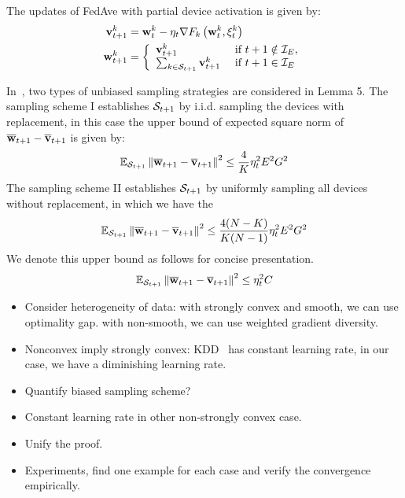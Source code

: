 The updates of FedAve with partial device activation is given by: 
\begin{align} 
\mathbf{v}_{t+1}^{k} &=\mathbf{w}_{t}^{k}-\eta_{t} \nabla F_{k}\left(\mathbf{w}_{t}^{k}, \xi_{t}^{k}\right) \\ \mathbf{w}_{t+1}^{k} &=\left\{\begin{array}{ll}\mathbf{v}_{t+1}^{k} & \text { if } t+1 \notin \mathcal{I}_{E}, \\ 
\sum_{k \in {\mathcal{S}}_{t+1}} \mathbf{v}_{t+1}^{k} & \text { if } t+1 \in \mathcal{I}_{E}\end{array}\right.
\end{align}

In~\cite{li2019convergence}, two types of unbiased sampling strategies are considered in Lemma 5. 
The sampling scheme I establishes ${\mathcal{S}}_{t+1}$ by i.i.d. sampling the devices with replacement,
in this case the upper bound of expected square norm of ${\overline{\mathbf{w}}}_{t+1} - {\overline{\mathbf{v}}}_{t+1}$ is given by:
\begin{align}
\mathbb{E}_{{\mathcal{S}}_{t+1}}\left\|{\overline{\mathbf{w}}}_{t+1} - {\overline{\mathbf{v}}}_{t+1}\right\|^2	\leq \frac{4}{K} \eta_t^2 E^2G^2
\end{align}
The sampling scheme II establishes ${\mathcal{S}}_{t+1}$ by uniformly sampling all devices without
replacement, in which we have the 
\begin{align}
\mathbb{E}_{{\mathcal{S}}_{t+1}}\left\|{\overline{\mathbf{w}}}_{t+1} - {\overline{\mathbf{v}}}_{t+1}\right\|^2	\leq \frac{4(N - K)}{K(N-1)} \eta_t^2 E^2G^2
\end{align}
We denote this upper bound as follows for concise presentation. 
\begin{align}
	\mathbb{E}_{{\mathcal{S}}_{t+1}}\left\|{\overline{\mathbf{w}}}_{t+1} - {\overline{\mathbf{v}}}_{t+1}\right\|^2 \leq  \eta_t^2 C
	\label{eq:partialsample}
\end{align}


\begin{itemize}
	\item Consider heterogeneity of data: with strongly convex and smooth, we can use optimality gap. with non-smooth, we can use weighted gradient diversity. 
	\item Nonconvex imply strongly convex: KDD~\cite{zhuo2019federated} has constant learning rate, in our case, we have a diminishing learning rate. 
	\item Quantify biased sampling scheme?
	\item Constant learning rate in other non-strongly convex case. 
	\item Unify the proof.
	\item Experiments, find one example for each case and verify the convergence empirically. 
\end{itemize}


